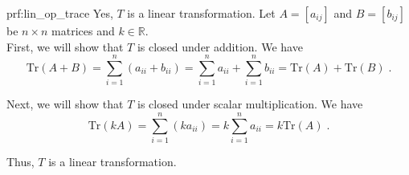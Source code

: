 \begin{prf}{prf:lin_op_trace} %
Yes, $T$ is a linear transformation. Let $A=[a_{ij}]$ and $B=[b_{ij}]$ be $n \times n$ matrices and $k \in \mathbb{R}$. \\

First, we will show that $T$ is closed under addition. We have
$$\text{Tr}(A+B) = \sum_{i=1}^n (a_{ii} + b_{ii}) = \sum_{i=1}^n a_{ii} + \sum_{i=1}^n b_{ii} = \text{Tr}(A) + \text{Tr}(B)\;.$$

Next, we will show that $T$ is closed under scalar multiplication. We have
$$\text{Tr}(kA) = \sum_{i=1}^n (ka_{ii}) = k \sum_{i=1}^n a_{ii} = k\text{Tr}(A)\;.$$

\noindent Thus, $T$ is a linear transformation.

\end{prf}
